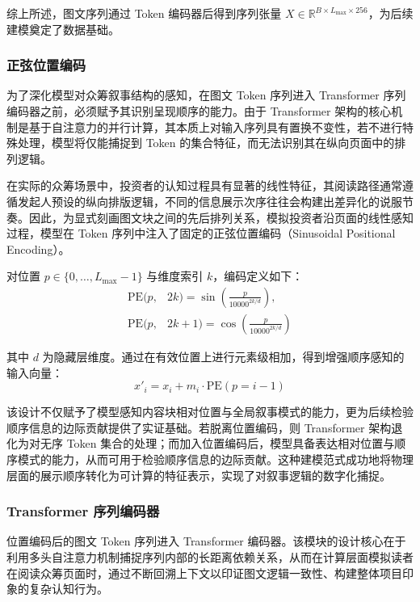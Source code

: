 综上所述，图文序列通过 Token 编码器后得到序列张量 $ X\in\mathbb{R}^{B\times L_{\max}\times 256} $，为后续建模奠定了数据基础。

\subsubsection{正弦位置编码}

为了深化模型对众筹叙事结构的感知，在图文 Token 序列进入 Transformer 序列编码器之前，必须赋予其识别呈现顺序的能力。由于 Transformer 架构的核心机制是基于自注意力的并行计算，其本质上对输入序列具有置换不变性，若不进行特殊处理，模型将仅能捕捉到 Token 的集合特征，而无法识别其在纵向页面中的排列逻辑。

在实际的众筹场景中，投资者的认知过程具有显著的线性特征，其阅读路径通常遵循发起人预设的纵向排版逻辑，不同的信息展示次序往往会构建出差异化的说服节奏。因此，为显式刻画图文块之间的先后排列关系，模拟投资者沿页面的线性感知过程，模型在 Token 序列中注入了固定的正弦位置编码（Sinusoidal Positional Encoding）。

对位置 $ p\in\{0,\ldots,L_{\max}-1\} $ 与维度索引 $ k $，编码定义如下：
\begin{equation}
\begin{aligned}
\text{PE}(p,&2k)=\sin\left(\frac{p}{10000^{2k/d}}\right), \\
\text{PE}(p,&2k+1)=\cos\left(\frac{p}{10000^{2k/d}}\right)
\end{aligned}
\end{equation}

其中 $ d $ 为隐藏层维度。通过在有效位置上进行元素级相加，得到增强顺序感知的输入向量：
\begin{equation}
x'_i=x_i+m_i\cdot \text{PE}(p=i-1)
\end{equation}

该设计不仅赋予了模型感知内容块相对位置与全局叙事模式的能力，更为后续检验顺序信息的边际贡献提供了实证基础。若脱离位置编码，则 Transformer 架构退化为对无序 Token 集合的处理；而加入位置编码后，模型具备表达相对位置与顺序模式的能力，从而可用于检验顺序信息的边际贡献。这种建模范式成功地将物理层面的展示顺序转化为可计算的特征表示，实现了对叙事逻辑的数字化捕捉。

\subsubsection{Transformer 序列编码器}

位置编码后的图文 Token 序列进入 Transformer 编码器。该模块的设计核心在于利用多头自注意力机制捕捉序列内部的长距离依赖关系，从而在计算层面模拟读者在阅读众筹页面时，通过不断回溯上下文以印证图文逻辑一致性、构建整体项目印象的复杂认知行为。

